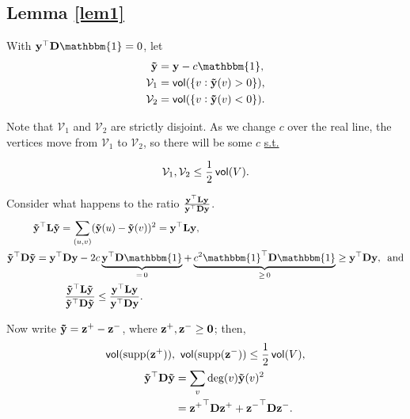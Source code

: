 \documentclass[11pt]{article}
\begin{document}
\subsection{Lemma \ref{lem1}}
With $\V{y}^{\top}\V{D}\mathbbm{1}=0$, let
\begin{align*}
\V{\tilde{y}} &= \V{y} - c\mathbbm{1}, \\
\mathcal{V}_1 &= \vol(\{v:\V{\tilde{y}}(v)>0\}), \\
\mathcal{V}_2 &= \vol(\{v:\V{\tilde{y}}(v)<0\}).
\end{align*}

Note that $\mathcal{V}_1$ and $\mathcal{V}_2$ are strictly disjoint. As we change $c$ over the real line, the vertices move from $\mathcal{V}_1$ to $\mathcal{V}_2$, so there will be some $c$ \underline{s.t.}

\begin{equation*}
\mathcal{V}_1, \mathcal{V}_2 \leq \frac{1}{2}\operatorname{\mathsf{vol}}(V).
\end{equation*}

Consider what happens to the ratio $\frac{\V{y}^{\top}\V{L}\V{y}}{\V{y}^{\top}\V{D}\V{y}}$.
\begin{align*}
\V{\tilde{y}}^{\top}\V{L}\V{\tilde{y}} = \sum_{(u,v)} (&\V{\tilde{y}}(u) - \V{\tilde{y}}(v))^2 = \V{y}^{\top}\V{L}\V{y}, \\
\V{\tilde{y}}^{\top}\V{D}\V{\tilde{y}} = \V{y}^{\top}\V{D}\V{y} - 2&c\underbrace{\V{y}^{\top}\V{D}\mathbbm{1}}_{\footnotesize = \, 0} + \underbrace{c^2\mathbbm{1}^{\top}\V{D}\mathbbm{1}}_{\footnotesize \geq \, 0} \geq \V{y}^{\top}\V{D}\V{y}, \,\,\, \mathrm{and} \\
\dfrac{\V{\tilde{y}}^{\top}\V{L}\V{\tilde{y}}}{\V{\tilde{y}}^{\top}\V{D}\V{\tilde{y}}} &\leq \dfrac{\V{y}^{\top}\V{L}\V{y}}{\V{y}^{\top}\V{D}\V{y}}.
\end{align*}

Now write $\V{\tilde{y}}=\V{z^+} - \V{z^-}$, where $\V{z^+}, \V{z^-} \geq \V{0}$; then,
\begin{align*}
\vol(\mathrm{supp}(\V{z^+})), &\ \vol(\mathrm{supp}(\V{z^-})) \leq \frac{1}{2}\vol(V), \\
\V{\tilde{y}}^{\top}\V{D}\V{\tilde{y}} &= \sum_v \text{deg}(v)\V{\tilde{y}}(v)^2 \\
&= \V{z^+}^{\top}\V{D}\V{z^+}+\V{z^-}^{\top}\V{D}\V{z^-}.
\end{align*}
\end{document}
